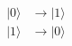 \documentclass[preview]{standalone}
\begin{document}
\begin{align*}
|0\rangle &\longrightarrow |1\rangle \\ |1\rangle &\longrightarrow |0\rangle
\end{align*}
\end{document}
